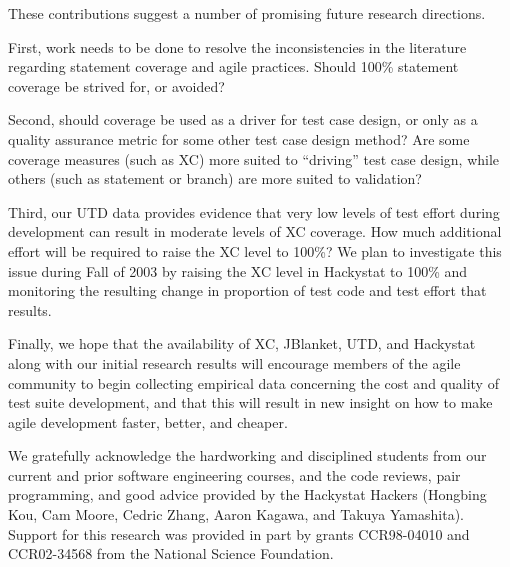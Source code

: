 \documentclass[10pt,twocolumn]{article}
\begin{document}
These contributions suggest a number of promising future research directions.

First, work needs to be done to resolve the inconsistencies in the
literature regarding statement coverage and agile practices.  Should
100\% statement coverage be strived for, or avoided?

Second, should coverage be used as a driver for test case design, or only
as a quality assurance metric for some other test case design method? Are
some coverage measures (such as XC) more suited to ``driving'' test case
design, while others (such as statement or branch) are more suited to
validation? 

Third, our UTD data provides evidence that very low levels of test effort
during development can result in moderate levels of XC coverage. How much
additional effort will be required to raise the XC level to 100\%? We plan
to investigate this issue during Fall of 2003 by raising the XC level in
Hackystat to 100\% and monitoring the resulting change in proportion of
test code and test effort that results. 

Finally, we hope that the availability of XC, JBlanket, UTD, and Hackystat
along with our initial research results will encourage members of the agile
community to begin collecting empirical data concerning the cost and
quality of test suite development, and that this will result in new insight
on how to make agile development faster, better, and cheaper.


We gratefully acknowledge the hardworking and disciplined students from our
current and prior software engineering courses, and the code reviews, pair
programming, and good advice provided by the Hackystat Hackers (Hongbing
Kou, Cam Moore, Cedric Zhang, Aaron Kagawa, and Takuya Yamashita).  Support
for this research was provided in part by grants CCR98-04010 and
CCR02-34568 from the National Science Foundation.



\end{document}
